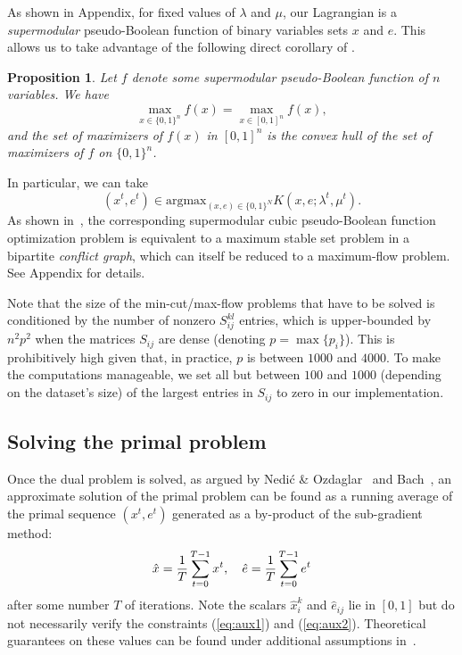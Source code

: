 \documentclass[10pt,twocolumn,letterpaper]{article}
\numberwithin{theorem}{section}
\newtheorem{proposition}[theorem]{Proposition}
\begin{document}
As shown in Appendix, for fixed values of $\lambda$ and $\mu$, 
our Lagrangian is a {\em supermodular} pseudo-Boolean function of 
binary variables sets $x$ and $e$.
This allows us to take
advantage of the following direct corollary of \cite[Prop. 3.7]{Bach13}.
\begin{proposition}
Let $f$ denote some supermodular pseudo-Boolean function of $n$
variables. We have
\begin{equation}
\max_{x\in\{0,1\}^n}f(x)=\max_{x\in[0,1]^n}f(x),
\end{equation}
and the set of maximizers of $f(x)$ in $[0,1]^n$ is the convex hull of
the set of maximizers of $f$ on $\{0,1\}^n$.
\end{proposition}
In particular, we can take
\begin{equation}
(x^t,e^t)\in\text{argmax}_{(x,e)\in\{0,1\}^N} K(x,e;\lambda^t,\mu^t).
\label{eq:max_xe}
\end{equation}
As shown in~\cite{BiMi85,BoHa02}, the corresponding
supermodular cubic pseudo-Boolean function optimization problem is
equivalent to a maximum stable set problem in a bipartite {\em
  conflict graph}, which can itself be reduced to a maximum-flow
problem. 
See Appendix for details.


Note that the size of the min-cut/max-flow problems that have to be
solved is conditioned by the number of nonzero $S_{ij}^{kl}$ entries,
which is upper-bounded by $n^2p^2$ when the matrices $S_{ij}$ are
dense (denoting $p=\max\{p_i\}$).  This is prohibitively high given that, in practice, $p$ is
between $1000$ and $4000$. To make the computations manageable, we set
all but between $100$ and $1000$ (depending on the dataset's size) of the largest entries in $S_{ij}$ to
zero in our implementation.

\subsection{Solving the primal problem}
Once the dual problem is solved, as argued by Nedi\'c \&
Ozdaglar~\cite{NeOz09} and Bach~\cite{Bach13}, an approximate solution
of the primal problem can be found as a running average of the primal
sequence $(x^t,e^t)$ generated as a by-product of the sub-gradient
method:
\vspace{-2mm}
\begin{equation}
\hat{x}=\frac{1}{T}\sum_{t=0}^{T-1} x^t,
\quad
\hat{e}=\frac{1}{T}\sum_{t=0}^{T-1} e^t
\vspace{-2mm}
\end{equation}
after some number $T$ of iterations.
Note the scalars $\hat{x}_i^k$ and $\hat{e}_{ij}$ lie in $[0,1]$ but
do not necessarily verify the constraints (\ref{eq:aux1}) and
(\ref{eq:aux2}). Theoretical guarantees on these values can be found
under additional assumptions in~\cite{Bach13,NeOz09}.
\end{document}
